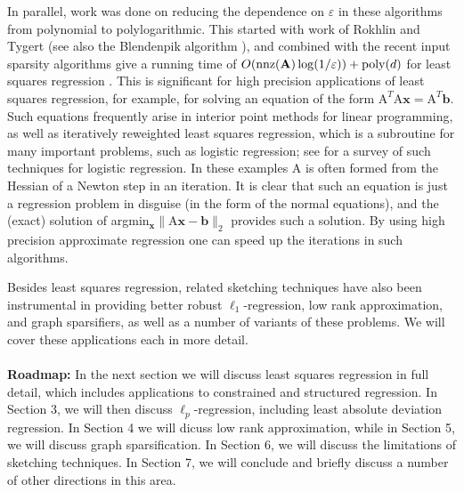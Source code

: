 \documentclass[11pt]{article}
\newcommand{\mat}[1]{{\ensuremath{\bm{\mathrm{#1}}}}}
\def\b{{\mathbf b}}
\def\matA{\mat{A}}
\def\nnz{{ \rm nnz }}
\def\x{{\mathbf x}}
\def\b{{\mathbf b}}
\newcommand{\eps}{\varepsilon}
\newcommand{\poly}{{\mathrm{poly}}}
\begin{document}
In parallel, work was done on reducing the dependence on $\eps$ in these algorithms from polynomial to polylogarithmic. This started with work of Rokhlin and Tygert \cite{RT08} (see also the Blendenpik algorithm \cite{amt10}), and combined with the recent input sparsity algorithms give a running time of $O(\nnz(\matA)\log(1/\eps)) + \poly(d)$ for least squares regression \cite{CW13}. This is significant for high precision applications of least squares regression, for example, for solving an equation of the form $\matA^T \matA \x = \matA^T \b$. Such equations frequently arise in interior point methods for linear programming, as well as iteratively reweighted least squares regression, which is a subroutine for many important problems, such as logistic regression; see
\cite{M03Compare} for a survey of such techniques for logistic regression. In these examples $\matA$ is often formed from the Hessian of a Newton step in an iteration. It is clear that such an equation is just a regression problem in disguise (in the form of the normal equations), and the (exact) solution of argmin$_{\x} \|\matA \x - \b\|_2$ provides such a solution. By using high precision approximate regression one can speed up the iterations in such algorithms. 

Besides least squares regression, related sketching techniques have also been 
instrumental in providing better robust $\ell_1$-regression, low rank approximation, 
and graph sparsifiers, as well as a number of variants of these problems. 
We will cover these applications each in more detail. 
\\\\
{\bf Roadmap:} In the next section we will
discuss least squares regression in full detail, which includes applications to
constrained and structured regression. In Section 3, we will then 
discuss $\ell_p$-regression, including least absolute deviation regression. In Section 4
we will dicuss low rank approximation, while in Section 5, we will discuss graph sparsification. 
In Section 6, we will discuss the limitations of sketching techniques. In Section 7, 
we will conclude and briefly discuss a number of other directions in this area.
\end{document}
